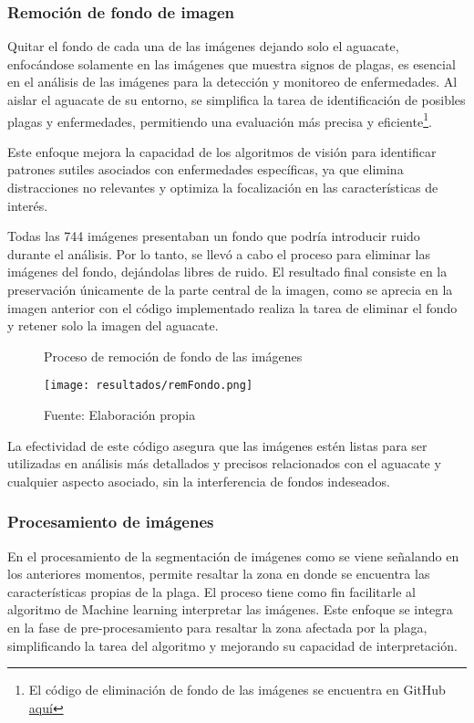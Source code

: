 \newpage

\subsubsection{Remoción de fondo de imagen}

Quitar el fondo de cada una de las imágenes dejando solo el aguacate, enfocándose solamente en las imágenes que muestra signos de plagas, es esencial en el análisis de las imágenes para la detección y monitoreo de enfermedades. Al aislar el aguacate de su entorno, se simplifica la tarea de identificación de posibles plagas y enfermedades, permitiendo una evaluación más precisa y eficiente\footnote{El código de eliminación de fondo de las imágenes se encuentra en GitHub \href{https://github.com/juferoto/mlops_project/blob/master/notebooks/removerFondo.ipynb}{aquí}}.

\newpage

Este enfoque mejora la capacidad de los algoritmos de visión para identificar patrones sutiles asociados con enfermedades específicas, ya que elimina distracciones no relevantes y optimiza la focalización en las características de interés.

Todas las 744 imágenes presentaban un fondo que podría introducir ruido durante el análisis. Por lo tanto, se llevó a cabo el proceso para eliminar las imágenes del fondo, dejándolas libres de ruido. El resultado final consiste en la preservación únicamente de la parte central de la imagen, como se aprecia en la imagen anterior con el código implementado realiza la tarea de eliminar el fondo y retener solo la imagen del aguacate.

\begin{figure}[h]
\centering
\caption{Proceso de remoción de fondo de las imágenes}
\texttt{[image: resultados/remFondo.png]}
\caption*{\footnotesize Fuente: Elaboración propia}
\label{fig:figuraRemFondo}
\end{figure} 

La efectividad de este código asegura que las imágenes estén listas para ser utilizadas en análisis más detallados y precisos relacionados con el aguacate y cualquier aspecto asociado, sin la interferencia de fondos indeseados.

\subsubsection{Procesamiento de imágenes}

En el procesamiento de la segmentación de imágenes como se viene señalando en los anteriores momentos, permite resaltar la zona en donde se encuentra las características propias de la plaga. El proceso tiene como fin facilitarle al algoritmo de Machine learning interpretar las imágenes. Este enfoque se integra en la fase de pre-procesamiento para resaltar la zona afectada por la plaga, simplificando la tarea del algoritmo y mejorando su capacidad de interpretación.

